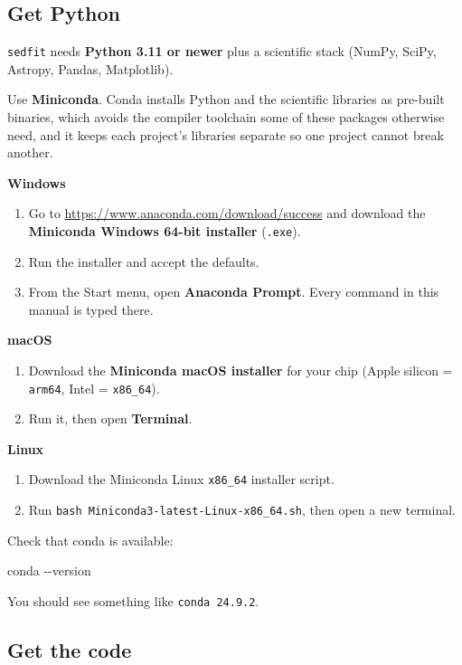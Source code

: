\documentclass[11pt]{article}
\newcommand{\cmdline}[1]{\begin{cmd}\ttfamily #1\end{cmd}}
\begin{document}
\subsection{Get Python}

\texttt{sedfit} needs \textbf{Python 3.11 or newer} plus a scientific
stack (NumPy, SciPy, Astropy, Pandas, Matplotlib).

Use \textbf{Miniconda}. Conda installs Python and the scientific
libraries as pre-built binaries, which avoids the compiler toolchain some
of these packages otherwise need, and it keeps each project's libraries
separate so one project cannot break another.

\textbf{Windows}
\begin{enumerate}
  \item Go to \url{https://www.anaconda.com/download/success} and
        download the \textbf{Miniconda Windows 64-bit installer}
        (\texttt{.exe}).
  \item Run the installer and accept the defaults.
  \item From the Start menu, open \textbf{Anaconda Prompt}. Every command
        in this manual is typed there.
\end{enumerate}

\textbf{macOS}
\begin{enumerate}
  \item Download the \textbf{Miniconda macOS installer} for your chip
        (Apple silicon = \texttt{arm64}, Intel = \texttt{x86\_64}).
  \item Run it, then open \textbf{Terminal}.
\end{enumerate}

\textbf{Linux}
\begin{enumerate}
  \item Download the Miniconda Linux \texttt{x86\_64} installer script.
  \item Run \texttt{bash Miniconda3-latest-Linux-x86\_64.sh}, then open a
        new terminal.
\end{enumerate}

Check that conda is available:

\cmdline{conda -{}-version}

You should see something like \texttt{conda 24.9.2}.

\subsection{Get the code}
\end{document}
